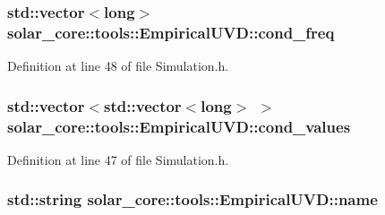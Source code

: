 \hypertarget{classsolar__core_1_1tools_1_1_empirical_u_v_d_a19135ba9bf7bb2c5c5819964e6149b2c}{}
\subsubsection[{cond\+\_\+freq}]{\setlength{\rightskip}{0pt plus 5cm}std\+::vector$<$long$>$ solar\+\_\+core\+::tools\+::\+Empirical\+U\+V\+D\+::cond\+\_\+freq}\label{classsolar__core_1_1tools_1_1_empirical_u_v_d_a19135ba9bf7bb2c5c5819964e6149b2c}


Definition at line 48 of file Simulation.\+h.

\hypertarget{classsolar__core_1_1tools_1_1_empirical_u_v_d_a51ef33f87ed7836a5239c39e8466efc6}{}
\subsubsection[{cond\+\_\+values}]{\setlength{\rightskip}{0pt plus 5cm}std\+::vector$<$std\+::vector$<$long$>$ $>$ solar\+\_\+core\+::tools\+::\+Empirical\+U\+V\+D\+::cond\+\_\+values}\label{classsolar__core_1_1tools_1_1_empirical_u_v_d_a51ef33f87ed7836a5239c39e8466efc6}


Definition at line 47 of file Simulation.\+h.

\hypertarget{classsolar__core_1_1tools_1_1_empirical_u_v_d_a4f2500cdf861542aa18c417564f43762}{}
\subsubsection[{name}]{\setlength{\rightskip}{0pt plus 5cm}std\+::string solar\+\_\+core\+::tools\+::\+Empirical\+U\+V\+D\+::name}\label{classsolar__core_1_1tools_1_1_empirical_u_v_d_a4f2500cdf861542aa18c417564f43762}


